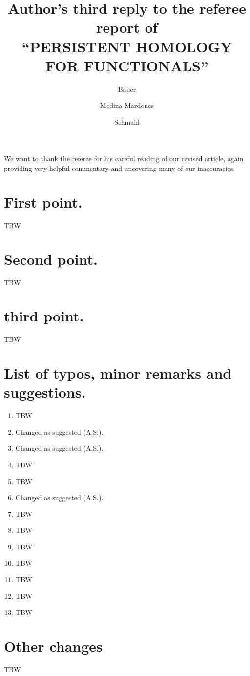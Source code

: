 \documentclass{article}
\title{Author's third reply to the referee report of \\ \textsc{
		``PERSISTENT HOMOLOGY FOR FUNCTIONALS''
	}
}
\author{Bauer \and Medina-Mardones \and Schmahl}
\begin{document}
	\maketitle
	We want to thank the referee for his careful reading of our revised article, again providing very helpful commentary and uncovering many of our inaccuracies.

	\section{First point.}
	TBW
	\section{Second point.}
	TBW
	\section{third point.}
	TBW
	\section{List of typos, minor remarks and suggestions.}
	\begin{enumerate}
		\item TBW
		\item Changed as suggested (A.S.).
		\item Changed as suggested (A.S.).
		\item TBW
		\item TBW
		\item Changed as suggested (A.S.).
		\item TBW
		\item TBW
		\item TBW
		\item TBW
		\item TBW
		\item TBW
		\item TBW
	\end{enumerate}

	\section{Other changes}
	TBW
\end{document}
